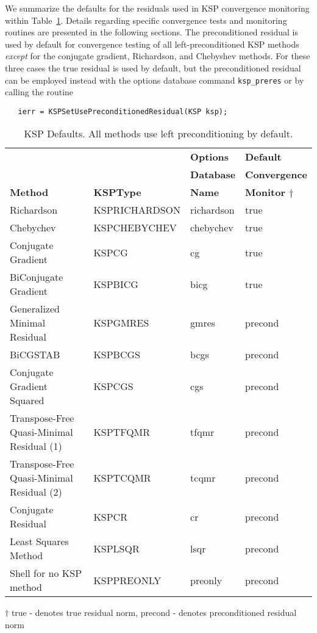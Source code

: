 We summarize the defaults for the residuals used in KSP convergence
monitoring within Table~\ref{tab:kspdefaults}.  Details regarding
specific convergence tests and monitoring routines are presented in
the following sections.  The preconditioned residual is used by
default for convergence testing of all left-preconditioned KSP
methods {\em except} for the conjugate gradient, Richardson, and
Chebyshev methods.  For these three cases the true residual is used by
default, but the preconditioned residual can be employed instead with
the options database command {\tt ksp\_preres} or by calling the routine
\begin{verbatim}
   ierr = KSPSetUsePreconditionedResidual(KSP ksp);
\end{verbatim}

\begin{table}
\begin{center}
\begin{tabular}{llll}
& & {\bf Options}       & {\bf Default}\\
& & {\bf Database}      & {\bf Convergence}\\
{\bf Method}    &{\bf KSPType}  & {\bf Name}    & {\bf Monitor $ \dagger $}\\
\hline
Richardson                                & KSPRICHARDSON & richardson  & true\\
Chebychev                                 & KSPCHEBYCHEV  & chebychev   & true\\
Conjugate Gradient \cite{hs:52}           & KSPCG         & cg          & true\\
BiConjugate Gradient                      & KSPBICG       & bicg        & true\\
Generalized Minimal Residual \cite{ss:86} & KSPGMRES      & gmres       & precond\\
BiCGSTAB \cite{v:92}                      & KSPBCGS       & bcgs        & precond \\
Conjugate Gradient Squared \cite{so:89}   & KSPCGS        & cgs         & precond \\
Transpose-Free Quasi-Minimal Residual (1) \cite{f:93} & KSPTFQMR & tfqmr & precond \\
Transpose-Free Quasi-Minimal Residual (2) & KSPTCQMR & tcqmr & precond \\
Conjugate Residual                        & KSPCR         & cr          & precond \\
Least Squares Method                      & KSPLSQR       & lsqr        & precond \\
Shell for no KSP method                   & KSPPREONLY    & preonly     & precond \\
\hline
\end{tabular}
\medskip \medskip
$ \dagger $ true - denotes true residual norm, precond - denotes preconditioned residual norm
\end{center}
\caption{KSP Defaults.  All methods use left preconditioning by default.}
\label{tab:kspdefaults}
\end{table}

